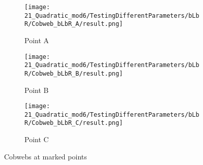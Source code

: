 \begin{figure}
	\centering
	\begin{subfigure}{0.3\textwidth}
		\centering
		\texttt{[image: 21\_Quadratic\_mod6/TestingDifferentParameters/bLbR/Cobweb\_bLbR\_A/result.png]}
		\caption{Point A}
		\label{fig:quad.full.bLbR.CobwebA}
	\end{subfigure}
	\begin{subfigure}{0.3\textwidth}
		\centering
		\texttt{[image: 21\_Quadratic\_mod6/TestingDifferentParameters/bLbR/Cobweb\_bLbR\_B/result.png]}
		\caption{Point B}
		\label{fig:quad.full.bLbR.CobwebB}
	\end{subfigure}
	\begin{subfigure}{0.3\textwidth}
		\centering
		\texttt{[image: 21\_Quadratic\_mod6/TestingDifferentParameters/bLbR/Cobweb\_bLbR\_C/result.png]}
		\caption{Point C}
		\label{fig:quad.full.bLbR.CobwebC}
	\end{subfigure}
	\caption{Cobwebs at marked points}
	\label{fig:quad.full.bLbR.Cobwebs}
\end{figure}
